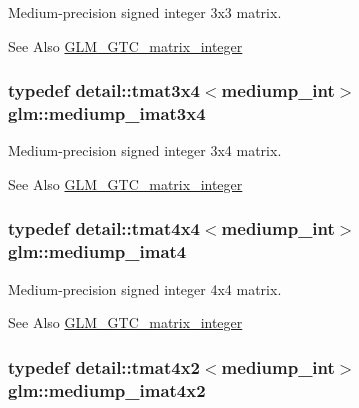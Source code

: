 Medium-\/precision signed integer 3x3 matrix. 

\begin{DoxySeeAlso}{See Also}
\hyperlink{group__gtc__matrix__integer}{G\-L\-M\-\_\-\-G\-T\-C\-\_\-matrix\-\_\-integer} 
\end{DoxySeeAlso}
\hypertarget{group__gtc__matrix__integer_ga2d58e291dd09052a80355106a5a36ea9}{
\subsubsection[{mediump\-\_\-imat3x4}]{\setlength{\rightskip}{0pt plus 5cm}typedef detail\-::tmat3x4$<$mediump\-\_\-int$>$ {\bf glm\-::mediump\-\_\-imat3x4}}}\label{group__gtc__matrix__integer_ga2d58e291dd09052a80355106a5a36ea9}


Medium-\/precision signed integer 3x4 matrix. 

\begin{DoxySeeAlso}{See Also}
\hyperlink{group__gtc__matrix__integer}{G\-L\-M\-\_\-\-G\-T\-C\-\_\-matrix\-\_\-integer} 
\end{DoxySeeAlso}
\hypertarget{group__gtc__matrix__integer_ga49908c8634fad44d78f09c3876c944db}{
\subsubsection[{mediump\-\_\-imat4}]{\setlength{\rightskip}{0pt plus 5cm}typedef detail\-::tmat4x4$<$mediump\-\_\-int$>$ {\bf glm\-::mediump\-\_\-imat4}}}\label{group__gtc__matrix__integer_ga49908c8634fad44d78f09c3876c944db}


Medium-\/precision signed integer 4x4 matrix. 

\begin{DoxySeeAlso}{See Also}
\hyperlink{group__gtc__matrix__integer}{G\-L\-M\-\_\-\-G\-T\-C\-\_\-matrix\-\_\-integer} 
\end{DoxySeeAlso}
\hypertarget{group__gtc__matrix__integer_ga258c149bc7dc443db025b6a7c8a8492b}{
\subsubsection[{mediump\-\_\-imat4x2}]{\setlength{\rightskip}{0pt plus 5cm}typedef detail\-::tmat4x2$<$mediump\-\_\-int$>$ {\bf glm\-::mediump\-\_\-imat4x2}}}\label{group__gtc__matrix__integer_ga258c149bc7dc443db025b6a7c8a8492b}


